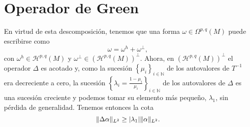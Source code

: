 \documentclass[12pt,a4paper]{article}
\theoremstyle{definition} \newtheorem{defn}[thm]{Definición}
\theoremstyle{definition} \newtheorem{ejemplo}[thm]{Ejemplo}
\theoremstyle{definition} \newtheorem{ejercicio}[thm]{Ejercicio}
\theoremstyle{remark} \newtheorem*{obs}{Observación}
\DeclarePairedDelimiter\norm{\lVert}{\rVert}
\newcommand{\NN}{\mathbb{N}}
\begin{document}
    \section{Operador de Green}
    En virtud de esta descomposición, tenemos que una forma $\omega \in \Omega^{p,q}(M)$ puede escribirse como 
    \begin{equation*}
      \omega=\omega^h + \omega^{\perp},
    \end{equation*}
    con $\omega^h\in \mathcal{H}^{p,q}(M)$ y $\omega^{\perp} \in (\mathcal{H}^{p,q}(M))^{\perp}$. Ahora, en $(\mathcal{H}^{p,q}(M))^{\perp}$ el operador $\Delta$ es acotado y, como la sucesión $\left\{ \mu_i \right\}_{i\in \NN}$ de los autovalores de $T^{-1}$ era decreciente a cero, la sucesión $\left\{ \lambda_i=\frac{1-\mu_i}{\mu_i} \right\}_{i\in \NN}$ de los autovalores de $\Delta$ es una sucesión creciente y podemos tomar su elemento más pequeño, $\lambda_1$, sin pérdida de generalidad. Tenemos entonces la cota
    \begin{equation*}
      \norm{\Delta \alpha}_{L^2} \geq |\lambda_1| \norm{\alpha}_{L^2}.
    \end{equation*}



    
\end{document}
